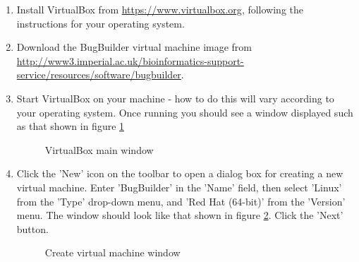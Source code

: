 \documentclass[a4paper,10pt]{article}
\begin{document}
\begin{enumerate}
\item Install VirtualBox from \url{https://www.virtualbox.org}, following the
instructions  for your operating system. 

\item Download the BugBuilder virtual machine image from
\url{http://www3.imperial.ac.uk/bioinformatics-support-service/resources/software/bugbuilder}.

\item Start VirtualBox on your machine - how to do this will vary according to
your operating system. Once running you should see a window displayed such as
that shown in figure \ref{fig:vm_install1}

\begin{figure}[!h] 
\caption{VirtualBox main window} \label{fig:vm_install1} \end{figure}

\item Click the 'New' icon on the toolbar to open a dialog box for creating a
new virtual machine. Enter 'BugBuilder' in the 'Name' field, then select
'Linux' from the 'Type' drop-down menu, and 'Red Hat (64-bit)' from the
'Version' menu. The window should look like that shown in figure
\ref{fig:vm_install2}. Click the 'Next' button.

\begin{figure}[H] 
\caption{Create virtual machine window} \label{fig:vm_install2} \end{figure}


\end{enumerate}
\end{document}
